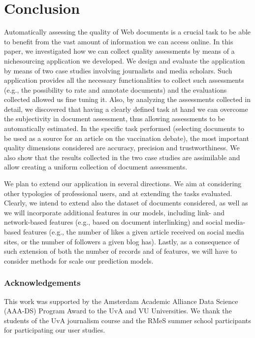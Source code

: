 \documentclass{llncs}
\begin{document}
\section{Conclusion}
\label{sec:conclusion}

Automatically assessing the quality of Web documents is a crucial task to be able to benefit from the vast amount of information we can access online. In this paper, we investigated how we can collect quality assessments by means of a nichesourcing application we developed. We design and evaluate the application by means of two case studies involving journalists and media scholars. Such application provides all the necessary functionalities to collect such assessments (e.g., the possibility to rate and annotate documents) and the evaluations collected allowed us fine tuning it. Also, by analyzing the assessments collected in detail, we discovered that having a clearly defined task at hand we can overcome the subjectivity in document assessment, thus allowing assessments to be automatically estimated. In the specific task performed (selecting documents to be used as a source for an article on the vaccination debate), the most important quality dimensions considered are accuracy, precision and trustworthiness. We also show that the results collected in the two case studies are assimilable and allow creating a uniform collection of document assessments.

We plan to extend our application in several directions. We aim at considering other typologies of professional users, and at extending the tasks evaluated. Clearly, we intend to extend also the dataset of documents considered, as well as we will incorporate additional features in our models, including link- and network-based features (e.g., based on document interlinking) and social media-based features (e.g., the number of likes a given article received on social media sites, or the number of followers a given blog has). Lastly, as a consequence of such extension of both the number of records and of features, we will have to consider methods for scale our prediction models.

\subsubsection{Acknowledgements} This work was supported by the Amsterdam Academic Alliance Data Science (AAA-DS) Program Award to the UvA and VU Universities.
We thank the students of the UvA journalism course and the RMeS summer school participants for participating our user studies. 


 
\end{document}
